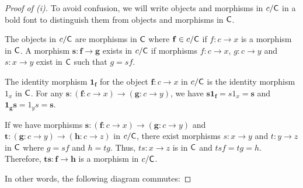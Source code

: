 
\begin{proof}[Proof of (i)]
To avoid confusion, we will write objects and morphisms in $c/\mathsf{C}$ in a bold font to distinguish them from objects and morphisms in $\mathsf{C}$.

The objects in $c/\mathsf{C}$ are morphisms in $\mathsf{C}$ where $\mathbf{f} \in c/\mathsf{C}$ if $f : c \rightarrow x$ is a morphism in $\mathsf{C}$.
A morphism $\mathbf{s}: \mathbf{f} \rightarrow \mathbf{g}$ exists in $c/\mathsf{C}$
if morphisms $f: c \rightarrow x$, $g:c \rightarrow y$ and $s:x \rightarrow y$ exist in $\mathsf{C}$ such that $g = sf$.

The identity morphism $\mathbf{1_f}$ for the object $\mathbf{f}: c \rightarrow x$ in $c/\mathsf{C}$ is the identity morphism $1_x$ in $\mathsf{C}$.
For any $\mathbf{s}: (\mathbf{f}: c \rightarrow x) \rightarrow (\mathbf{g}:c \rightarrow y)$, we have
$\mathbf{s}\mathbf{1_f} = s 1_x = \mathbf{s}$ and $\mathbf{1_g}\mathbf{s} = 1_y s = \mathbf{s}$.

If we have morphisms $\mathbf{s} : (\mathbf{f}: c \rightarrow x) \rightarrow (\mathbf{g}:c \rightarrow y)$ and
$\mathbf{t} : (\mathbf{g}: c \rightarrow y) \rightarrow (\mathbf{h}:c \rightarrow z)$ in $c/\mathsf{C}$, there exist morphisms
$s : x \rightarrow y$ and $t : y \rightarrow z$ in $\mathsf{C}$ where $g = sf$ and $h = tg$.
Thus, $ts: x \rightarrow z$ is in $\mathsf{C}$ and $tsf = tg = h$.
Therefore, $\mathbf{ts}: \mathbf{f} \rightarrow \mathbf{h}$ is a morphism in $c/\mathsf{C}$.

In other words, the following diagram commutes:

\end{proof}

